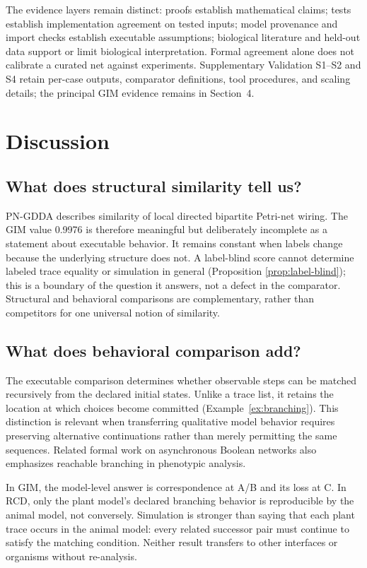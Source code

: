 \documentclass{ws-jbcb}
\numberwithin{equation}{section}
\begin{document}
The evidence layers remain distinct: proofs establish mathematical claims;
tests establish implementation agreement on tested inputs; model provenance
and import checks establish executable assumptions; biological literature and
held-out data support or limit biological interpretation. Formal agreement alone
does not calibrate a curated net against experiments. Supplementary Validation
S1--S2 and S4 retain per-case outputs, comparator definitions, tool procedures,
and scaling details; the principal GIM evidence remains in Section~4.

\section{Discussion}\label{sec:discussion}

\subsection{What does structural similarity tell us?}
PN-GDDA describes similarity of local directed bipartite Petri-net wiring.
The GIM value 0.9976 is therefore meaningful but deliberately incomplete as a
statement about executable behavior. It remains constant when labels change
because the underlying structure does not. A label-blind score cannot determine
labeled trace equality or simulation in general (Proposition
\ref{prop:label-blind}); this is a boundary of the question it answers, not a
defect in the comparator. Structural and behavioral comparisons are
complementary, rather than competitors for one universal notion of similarity.

\subsection{What does behavioral comparison add?}
The executable comparison determines whether observable steps can be matched
recursively from the declared initial states. Unlike a trace list, it retains
the location at which choices become committed (Example~\ref{ex:branching}).
This distinction is relevant when transferring qualitative model behavior
requires preserving alternative continuations rather than merely permitting
the same sequences. Related formal work on asynchronous Boolean networks also
emphasizes reachable branching in phenotypic analysis.\cite{Yizengaw2026}

In GIM, the model-level answer is correspondence at A/B and its loss at C.
In RCD, only the plant model's declared branching behavior is reproducible by
the animal model, not conversely. Simulation is stronger than saying that
each plant trace occurs in the animal model: every related successor pair
must continue to satisfy the matching condition. Neither result transfers to
other interfaces or organisms without re-analysis.
\end{document}

